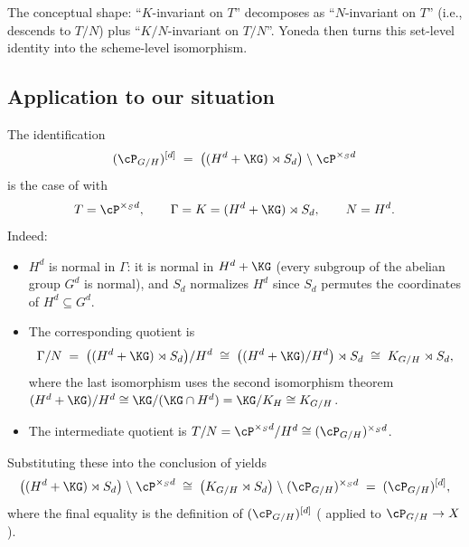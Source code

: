 The conceptual shape: ``$K$-invariant on $T$'' decomposes as ``$N$-invariant on $T$'' (i.e., descends to $T/N$) plus ``$K/N$-invariant on $T/N$''. Yoneda then turns this set-level identity into the scheme-level isomorphism.

\subsection*{Application to our situation}

The identification
\[
(\cP_{G/H})^{[d]} \;=\; \bigl((H^d + \KG) \rtimes S_d\bigr) \;\backslash\; \cP^{\times_S d}
\]
is the case of  with
\[
T = \cP^{\times_S d}, \qquad \Gamma = K = (H^d + \KG) \rtimes S_d, \qquad N = H^d.
\]
Indeed:
\begin{itemize}
    \item $H^d$ is normal in $\Gamma$: it is normal in $H^d + \KG$ (every subgroup of the abelian group $G^d$ is normal), and $S_d$ normalizes $H^d$ since $S_d$ permutes the coordinates of $H^d \subseteq G^d$.
    \item The corresponding quotient is
    \[
    \Gamma/N \;=\; \bigl((H^d + \KG) \rtimes S_d\bigr) / H^d \;\cong\; \bigl((H^d + \KG)/H^d\bigr) \rtimes S_d \;\cong\; K_{G/H} \rtimes S_d,
    \]
    where the last isomorphism uses the second isomorphism theorem $(H^d + \KG)/H^d \cong \KG/(\KG \cap H^d) = \KG/K_H \cong K_{G/H}$.
    \item The intermediate quotient is $T/N = \cP^{\times_S d}/H^d \cong (\cP_{G/H})^{\times_S d}$.
\end{itemize}
Substituting these into the conclusion of  yields
\[
\bigl((H^d + \KG) \rtimes S_d\bigr) \;\backslash\; \cP^{\times_S d} \;\cong\; \bigl(K_{G/H} \rtimes S_d\bigr) \;\backslash\; (\cP_{G/H})^{\times_S d} \;=\; (\cP_{G/H})^{[d]},
\]
where the final equality is the definition of $(\cP_{G/H})^{[d]}$ ( applied to $\cP_{G/H} \to X$).

